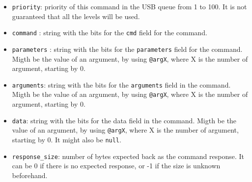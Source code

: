 \documentclass[12pt,a4paper]{report}
\begin{document}
\begin{itemize}
\item \texttt{priority}: priority of this command in the USB queue from 1 to 100. It is not guaranteed that all the levels will be used.
\item \texttt{command} : string with the bits for the \texttt{cmd} field for the command.
\item \texttt{parameters} : string with the bits for the \texttt{parameters} field for the command. Migth be the value of an argument, by using \texttt{@argX}, where X is the number of argument, starting by 0.
\item \texttt{arguments}: string with the bits for the \texttt{arguments} field in the command. Migth be the value of an argument, by using \texttt{@argX}, where X is the number of argument, starting by 0.
\item \texttt{data}: string with the bits for the data field in the command. Migth be the value of an argument, by using \texttt{@argX}, where X is the number of argument, starting by 0. It might also be \texttt{null}.
\item \texttt{response\_size}: number of bytes expected back as the command response. It can be 0 if there is no expected response, or -1 if the size is unknown beforehand.
\end{itemize}
\end{document}

